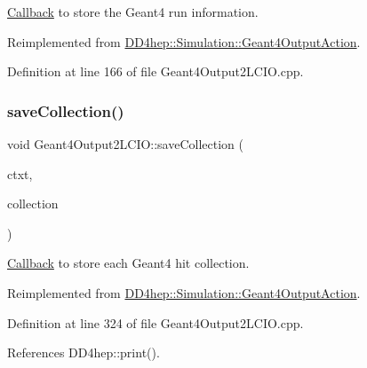 \hyperlink{class_d_d4hep_1_1_callback}{Callback} to store the Geant4 run information. 



Reimplemented from \hyperlink{class_d_d4hep_1_1_simulation_1_1_geant4_output_action_ac89540100411ccec1804da9afbb843a4}{D\+D4hep\+::\+Simulation\+::\+Geant4\+Output\+Action}.



Definition at line 166 of file Geant4\+Output2\+L\+C\+I\+O.\+cpp.

\hypertarget{class_d_d4hep_1_1_simulation_1_1_geant4_output2_l_c_i_o_aeba8f94323098614ee901a3ff0642c73}{}\label{class_d_d4hep_1_1_simulation_1_1_geant4_output2_l_c_i_o_aeba8f94323098614ee901a3ff0642c73} 
\subsubsection{\texorpdfstring{save\+Collection()}{saveCollection()}}
{\footnotesize\ttfamily void Geant4\+Output2\+L\+C\+I\+O\+::save\+Collection (\begin{DoxyParamCaption}\item[{\hyperlink{class_d_d4hep_1_1_simulation_1_1_geant4_output_action_1_1_output_context}{Output\+Context}$<$ G4\+Event $>$ \&}]{ctxt,  }\item[{\hyperlink{class_g4_v_hits_collection}{G4\+V\+Hits\+Collection} $\ast$}]{collection }\end{DoxyParamCaption})\hspace{0.3cm}{\ttfamily [virtual]}}



\hyperlink{class_d_d4hep_1_1_callback}{Callback} to store each Geant4 hit collection. 



Reimplemented from \hyperlink{class_d_d4hep_1_1_simulation_1_1_geant4_output_action_aa43d1f01dbcb11ac1d937a878d87a90f}{D\+D4hep\+::\+Simulation\+::\+Geant4\+Output\+Action}.



Definition at line 324 of file Geant4\+Output2\+L\+C\+I\+O.\+cpp.



References D\+D4hep\+::print().

